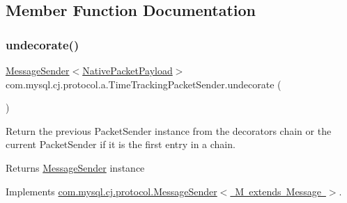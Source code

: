 \subsection{Member Function Documentation}
\mbox{\label{classcom_1_1mysql_1_1cj_1_1protocol_1_1a_1_1_time_tracking_packet_sender_a5e29cda7005857f658352ef487c541ac}} 
\subsubsection{\texorpdfstring{undecorate()}{undecorate()}}
{\footnotesize\ttfamily \mbox{\hyperlink{interfacecom_1_1mysql_1_1cj_1_1protocol_1_1_message_sender}{Message\+Sender}}$<$\mbox{\hyperlink{classcom_1_1mysql_1_1cj_1_1protocol_1_1a_1_1_native_packet_payload}{Native\+Packet\+Payload}}$>$ com.\+mysql.\+cj.\+protocol.\+a.\+Time\+Tracking\+Packet\+Sender.\+undecorate (\begin{DoxyParamCaption}{ }\end{DoxyParamCaption})}

Return the previous Packet\+Sender instance from the decorators chain or the current Packet\+Sender if it is the first entry in a chain.

\begin{DoxyReturn}{Returns}
\mbox{\hyperlink{interfacecom_1_1mysql_1_1cj_1_1protocol_1_1_message_sender}{Message\+Sender}} instance 
\end{DoxyReturn}


Implements \mbox{\hyperlink{interfacecom_1_1mysql_1_1cj_1_1protocol_1_1_message_sender_a3a352bf35ad98dc6cea7c1f4ac9480da}{com.\+mysql.\+cj.\+protocol.\+Message\+Sender$<$ M extends Message $>$}}.

\mbox{\label{classcom_1_1mysql_1_1cj_1_1protocol_1_1a_1_1_time_tracking_packet_sender_a26a673b209acd1d181f62dceed280750}} 
